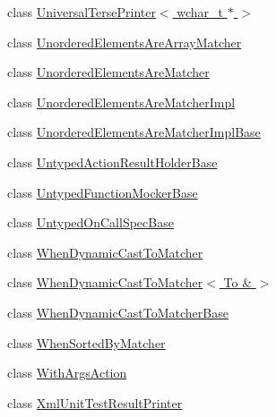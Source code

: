 \begin{DoxyCompactItemize}
\item 
class \hyperlink{classtesting_1_1internal_1_1_universal_terse_printer_3_01wchar__t_01_5_01_4}{Universal\+Terse\+Printer$<$ wchar\+\_\+t $\ast$ $>$}
\item 
class \hyperlink{classtesting_1_1internal_1_1_unordered_elements_are_array_matcher}{Unordered\+Elements\+Are\+Array\+Matcher}
\item 
class \hyperlink{classtesting_1_1internal_1_1_unordered_elements_are_matcher}{Unordered\+Elements\+Are\+Matcher}
\item 
class \hyperlink{classtesting_1_1internal_1_1_unordered_elements_are_matcher_impl}{Unordered\+Elements\+Are\+Matcher\+Impl}
\item 
class \hyperlink{classtesting_1_1internal_1_1_unordered_elements_are_matcher_impl_base}{Unordered\+Elements\+Are\+Matcher\+Impl\+Base}
\item 
class \hyperlink{classtesting_1_1internal_1_1_untyped_action_result_holder_base}{Untyped\+Action\+Result\+Holder\+Base}
\item 
class \hyperlink{classtesting_1_1internal_1_1_untyped_function_mocker_base}{Untyped\+Function\+Mocker\+Base}
\item 
class \hyperlink{classtesting_1_1internal_1_1_untyped_on_call_spec_base}{Untyped\+On\+Call\+Spec\+Base}
\item 
class \hyperlink{classtesting_1_1internal_1_1_when_dynamic_cast_to_matcher}{When\+Dynamic\+Cast\+To\+Matcher}
\item 
class \hyperlink{classtesting_1_1internal_1_1_when_dynamic_cast_to_matcher_3_01_to_01_6_01_4}{When\+Dynamic\+Cast\+To\+Matcher$<$ To \& $>$}
\item 
class \hyperlink{classtesting_1_1internal_1_1_when_dynamic_cast_to_matcher_base}{When\+Dynamic\+Cast\+To\+Matcher\+Base}
\item 
class \hyperlink{classtesting_1_1internal_1_1_when_sorted_by_matcher}{When\+Sorted\+By\+Matcher}
\item 
class \hyperlink{classtesting_1_1internal_1_1_with_args_action}{With\+Args\+Action}
\item 
class \hyperlink{classtesting_1_1internal_1_1_xml_unit_test_result_printer}{Xml\+Unit\+Test\+Result\+Printer}
\end{DoxyCompactItemize}
